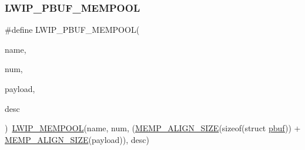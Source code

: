 \subsubsection{\texorpdfstring{L\+W\+I\+P\+\_\+\+P\+B\+U\+F\+\_\+\+M\+E\+M\+P\+O\+OL}{LWIP\_PBUF\_MEMPOOL}}
{\footnotesize\ttfamily \#define L\+W\+I\+P\+\_\+\+P\+B\+U\+F\+\_\+\+M\+E\+M\+P\+O\+OL(\begin{DoxyParamCaption}\item[{}]{name,  }\item[{}]{num,  }\item[{}]{payload,  }\item[{}]{desc }\end{DoxyParamCaption})~\hyperlink{openmote-cc2538_2lwip_2src_2include_2lwip_2memp_8h_a5f75b6e9cf0c6df9e70b08b8e05a1835}{L\+W\+I\+P\+\_\+\+M\+E\+M\+P\+O\+OL}(name, num, (\hyperlink{openmote-cc2538_2lwip_2src_2include_2lwip_2priv_2memp__priv_8h_a12e0cfbac9c8263e5a1fb319b92338e7}{M\+E\+M\+P\+\_\+\+A\+L\+I\+G\+N\+\_\+\+S\+I\+ZE}(sizeof(struct \hyperlink{structpbuf}{pbuf})) + \hyperlink{openmote-cc2538_2lwip_2src_2include_2lwip_2priv_2memp__priv_8h_a12e0cfbac9c8263e5a1fb319b92338e7}{M\+E\+M\+P\+\_\+\+A\+L\+I\+G\+N\+\_\+\+S\+I\+ZE}(payload)), desc)}

